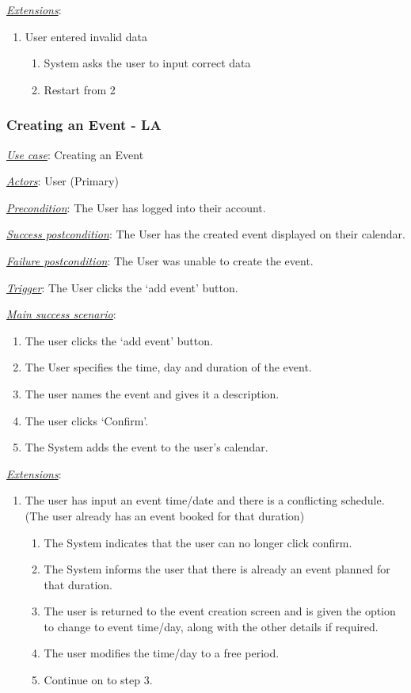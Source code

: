 \documentclass[a4paper]{article}
\begin{document}
\underline{\textit{Extensions}}:
\begin{enumerate}[label=3\alph*, leftmargin = 3em]
    \item User entered invalid data \begin{enumerate}[label=\arabic*.]
        \item System asks the user to input correct data
        \item Restart from 2
    \end{enumerate}
\end{enumerate}

\subsubsection{Creating an Event - LA}
\underline{\textit{Use case}}: Creating an Event

\underline{\textit{Actors}}: User (Primary)

\underline{\textit{Precondition}}: The User has logged into their account.

\underline{\textit{Success postcondition}}: The User has the created event displayed on their calendar.

\underline{\textit{Failure postcondition}}: The User was unable to create the event.

\underline{\textit{Trigger}}: The User clicks the ‘add event’ button.

\underline{\textit{Main success scenario}}: 
\begin{enumerate}[leftmargin = 3em]
    \item The user clicks the ‘add event’ button.
    \item The User specifies the time, day and duration of the event.
    \item The user names the event and gives it a description.
    \item The user clicks ‘Confirm’.
    \item The System adds the event to the user’s calendar.
\end{enumerate} 

\underline{\textit{Extensions}}:
\begin{enumerate}[label=2\alph*, leftmargin = 3em]
    \item The user has input an event time/date and there is a conflicting schedule. (The user already has an event booked for that duration) \begin{enumerate}[label=\arabic*.]
        \item The System indicates that the user can no longer click confirm.
        \item The System informs the user that there is already an event planned for that duration.
        \item The user is returned to the event creation screen and is given the option to change to event time/day, along with the other details if required.
        \item The user modifies the time/day to a free period.
        \item Continue on to step 3.
    \end{enumerate}
\end{enumerate}
\end{document}
